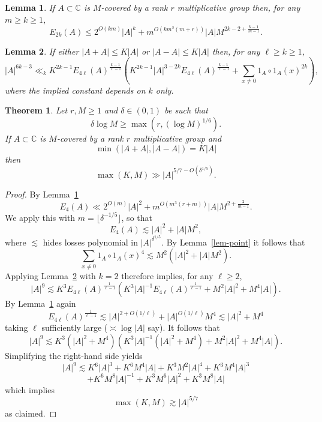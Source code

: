 \documentclass[10pt,a4paper]{amsart}
\newtheorem{lemma}{Lemma}
\newtheorem{theorem}{Theorem}
\newcommand{\abs}[1]{\left\lvert #1\right\rvert}
\newcommand{\bbc}{\mathbb{C}}
\newcommand{\brac}[1]{\left( #1\right)}
\renewcommand{\geq}{\geqslant}
\renewcommand{\leq}{\leqslant}
\newcommand{\ls}{\lesssim}
\begin{document}
\begin{lemma}\label{lem-energy}
If $A\subset \bbc$ is $M$-covered by a rank $r$ multiplicative group then, for any $m\geq k\geq 1$,
\[E_{2k}(A)\leq 2^{O(km)}\abs{A}^{k}+m^{O(km^3(m+r))}\abs{A}M^{2k-2+\frac{k-1}{m-1}}.\]
\end{lemma}

\begin{lemma}\label{lem-pop}
If either $\abs{A+A}\leq K\abs{A}$ or $\abs{A-A}\leq K\abs{A}$ then, for any $\ell\geq k\geq 1$,
\[\abs{A}^{6k-3}\ll_k K^{2k-1}E_{4\ell}(A)^{\frac{k-1}{\ell-1}}\brac{ K^{2k-1}\abs{A}^{3-2k}E_{4\ell}(A)^{\frac{k-1}{\ell-1}}+ \sum_{x\neq 0}1_A\circ 1_A(x)^{2k}},\]
where the implied constant depends on $k$ only.
\end{lemma}

\begin{theorem}\label{th-growth}
Let $r,M\geq 1$ and $\delta\in (0,1)$ be such that
\[\delta \log M \geq \max(r,(\log M)^{1/6}).\]
If $A\subset \bbc$ is $M$-covered by a rank $r$ multiplicative group and 
\[\min(\abs{A+A},\abs{A-A})=K\abs{A}\]
then
\[\max(K,M)\gg \abs{A}^{5/7-O(\delta^{1/5})} .\]
\end{theorem}

\begin{proof}
By Lemma~\ref{lem-energy}
\[E_4(A) \ll 2^{O(m)}\abs{A}^2+m^{O(m^3(r+m))}\abs{A}M^{2+\frac{2}{m-1}}.\] 
We apply this with $m=\lfloor \delta^{-1/5}\rfloor$, so that
\[E_4(A) \lesssim \abs{A}^2+\abs{A}M^2,\]
where $\ls$ hides losses polynomial in $\abs{A}^{\delta^{1/5}}$. By Lemma~\ref{lem-point} it follows that
\[\sum_{x\neq 0} 1_A\circ 1_A(x)^4\lesssim M^2\brac{\abs{A}^2+\abs{A}M^2}.\]
Applying Lemma~\ref{lem-pop} with $k=2$ therefore implies, for any $\ell\geq 2$,
\[\abs{A}^{9}\ls K^{3}E_{4\ell}(A)^{\frac{1}{\ell-1}}\brac{K^3\abs{A}^{-1}E_{4\ell}(A)^{\frac{1}{\ell-1}}+M^2\abs{A}^2+M^4\abs{A}}.\]
By Lemma~\ref{lem-energy} again 
\[E_{4\ell}(A)^{\frac{1}{\ell-1}} \ls \abs{A}^{2+O(1/\ell)}+\abs{A}^{O(1/\ell)}M^{4}\ls \abs{A}^2+M^4\]
taking $\ell$ sufficiently large ($\asymp \log \abs{A}$ say). It follows that 
\[\abs{A}^{9}\ls K^{3}(\abs{A}^2+M^4)\brac{K^3\abs{A}^{-1}(\abs{A}^2+M^4)+M^2\abs{A}^2+M^4\abs{A}}.\]
Simplifying the right-hand side yields
\[\abs{A}^9\ls K^6\abs{A}^3+K^6M^4\abs{A}+K^3M^2\abs{A}^4+K^3M^4\abs{A}^3\]
\[ +K^6M^8\abs{A}^{-1}+K^3M^6\abs{A}^2+K^3M^8\abs{A}\]
which implies
\[\max(K,M) \gtrsim \abs{A}^{5/7}\]
as claimed. 
\end{proof}
\end{document}
